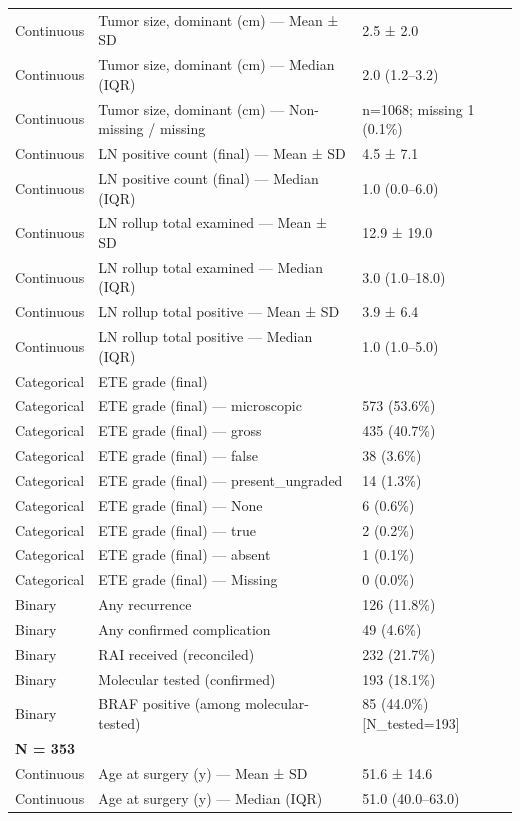 \begin{table}[htbp]
\begin{tabular}{lll}
Continuous & Tumor size, dominant (cm) — Mean ± SD & 2.5 ± 2.0 \\
Continuous & Tumor size, dominant (cm) — Median (IQR) & 2.0 (1.2–3.2) \\
Continuous & Tumor size, dominant (cm) — Non-missing / missing & n=1068; missing 1 (0.1\%) \\
Continuous & LN positive count (final) — Mean ± SD & 4.5 ± 7.1 \\
Continuous & LN positive count (final) — Median (IQR) & 1.0 (0.0–6.0) \\
Continuous & LN rollup total examined — Mean ± SD & 12.9 ± 19.0 \\
Continuous & LN rollup total examined — Median (IQR) & 3.0 (1.0–18.0) \\
Continuous & LN rollup total positive — Mean ± SD & 3.9 ± 6.4 \\
Continuous & LN rollup total positive — Median (IQR) & 1.0 (1.0–5.0) \\
Categorical & ETE grade (final) &  \\
Categorical & ETE grade (final) — microscopic & 573 (53.6\%) \\
Categorical & ETE grade (final) — gross & 435 (40.7\%) \\
Categorical & ETE grade (final) — false & 38 (3.6\%) \\
Categorical & ETE grade (final) — present\_ungraded & 14 (1.3\%) \\
Categorical & ETE grade (final) — None & 6 (0.6\%) \\
Categorical & ETE grade (final) — true & 2 (0.2\%) \\
Categorical & ETE grade (final) — absent & 1 (0.1\%) \\
Categorical & ETE grade (final) — Missing & 0 (0.0\%) \\
Binary & Any recurrence & 126 (11.8\%) \\
Binary & Any confirmed complication & 49 (4.6\%) \\
Binary & RAI received (reconciled) & 232 (21.7\%) \\
Binary & Molecular tested (confirmed) & 193 (18.1\%) \\
Binary & BRAF positive (among molecular-tested) & 85 (44.0\%) [N\_tested=193] \\
\multicolumn{3}{l}{\textbf{N = 353}} \\
Continuous & Age at surgery (y) — Mean ± SD & 51.6 ± 14.6 \\
Continuous & Age at surgery (y) — Median (IQR) & 51.0 (40.0–63.0) \\

\end{tabular}
\end{table}

